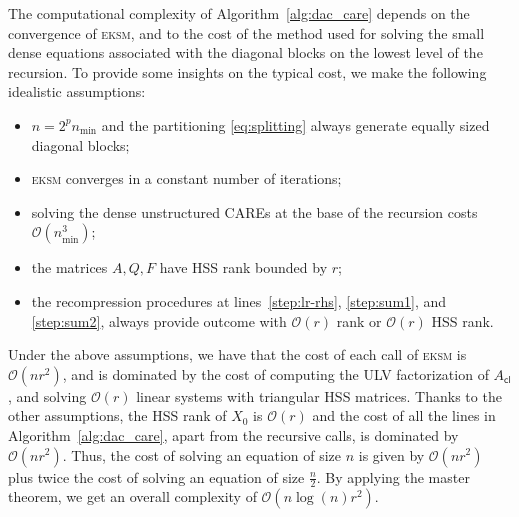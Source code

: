 \documentclass[a4paper,10pt]{article}
\begin{document}
The computational complexity of Algorithm~\ref{alg:dac_care} depends on the convergence of \textsc{eksm}, and to the cost of the method used for solving the small dense equations associated with the diagonal blocks on the lowest
level of the recursion. To provide some insights on the typical cost,
we make the following idealistic assumptions:
\begin{itemize}
	\item $n=2^pn_{\min}$ and the partitioning \eqref{eq:splitting} always generate equally sized
	diagonal blocks;
	\item \textsc{eksm} converges in a constant number of iterations;
	\item solving the dense unstructured CAREs at the base of the recursion costs $\mathcal O(n_{\min}^3)$;
	\item the matrices $A,Q,F$ have HSS rank bounded by $r$;
	\item the recompression procedures at lines~\ref{step:lr-rhs}, \ref{step:sum1}, and \ref{step:sum2}, always provide outcome with $\mathcal O(r)$ rank or $\mathcal O(r)$ HSS rank. 
\end{itemize}
Under the above assumptions, we have that the cost of each call of \textsc{eksm} is $\mathcal O(nr^2)$, and is dominated by the cost of computing the ULV factorization of $A_{\mathsf{cl}}$, and solving $\mathcal O(r)$ linear systems with triangular HSS matrices. Thanks to the other assumptions, the HSS rank of $X_0$ is $\mathcal O(r)$ and the cost of all the lines in Algorithm~\ref{alg:dac_care}, apart from the recursive calls, is dominated by $\mathcal O(nr^2)$. Thus, the cost of solving an equation of size $n$ is given by $\mathcal O(nr^2)$ plus twice the cost of solving an equation of size $\frac n2$. By applying the master theorem, we get an overall complexity of $\mathcal O(n\log(n)r^2)$.  
\end{document}
